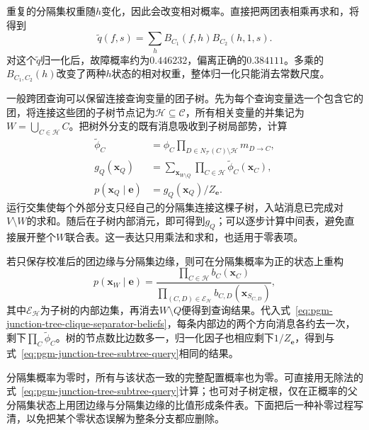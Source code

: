重复的分隔集权重随$h$变化，因此会改变相对概率。直接把两团表相乘再求和，将得到
\[
  \widetilde{q}(f,s)=\sum_h B_{C_1}(f,h)B_{C_2}(h,1,s).
\]
对这个$\widetilde q$归一化后，故障概率约为$0.446232$，偏离正确的$0.384111$。多乘的$B_{C_1,C_2}(h)$改变了两种$h$状态的相对权重，整体归一化只能消去常数尺度。

一般跨团查询可以保留连接查询变量的团子树。先为每个查询变量选一个包含它的团，将连接这些团的子树节点记为$\mathcal H\subseteq\mathcal C$，所有相关变量的并集记为$W=\bigcup_{C\in\mathcal H}C$。把树外分支的既有消息吸收到子树局部势，计算
\begin{equation}
  \begin{aligned}
    \widetilde{\phi}_C
      &=\phi_C
        \prod_{D\in N_{\mathcal{T}}(C)\setminus\mathcal{H}}m_{D\to C},\\
    g_Q(\bm{x}_Q)
      &=\sum_{\bm{x}_{W\setminus Q}}
         \prod_{C\in\mathcal{H}}\widetilde{\phi}_C(\bm{x}_C),\\
    p(\bm{x}_Q\mid\bm{e})&=g_Q(\bm{x}_Q)/Z_{\bm{e}}.
  \end{aligned}
  \label{eq:pgm-junction-tree-subtree-query}
\end{equation}
运行交集使每个外部分支只经自己的分隔集连接这棵子树，入站消息已完成对$V\setminus W$的求和。随后在子树内部消元，即可得到$g_Q$；可以逐步计算中间表，避免直接展开整个$W$联合表。这一表达只用乘法和求和，也适用于零表项。

若只保存校准后的团边缘与分隔集边缘，则可在分隔集概率为正的状态上重构
\begin{equation}
  p(\bm{x}_W\mid\bm{e})
    =\frac{\prod_{C\in\mathcal{H}}b_C(\bm{x}_C)}
           {\prod_{(C,D)\in\mathcal{E}_{\mathcal{H}}}
                b_{C,D}(\bm{x}_{S_{C,D}})},
  \label{eq:pgm-junction-tree-calibrated-factorization}
\end{equation}
其中$\mathcal E_{\mathcal H}$为子树的内部边集，再消去$W\setminus Q$便得到查询结果。代入式~\eqref{eq:pgm-junction-tree-clique-separator-beliefs}，每条内部边的两个方向消息各约去一次，剩下$\prod_C\widetilde\phi_C$。树的节点数比边数多一，归一化因子也相应剩下$1/Z_{\bm e}$，得到与式~\eqref{eq:pgm-junction-tree-subtree-query}相同的结果。

分隔集概率为零时，所有与该状态一致的完整配置概率也为零。可直接用无除法的式~\eqref{eq:pgm-junction-tree-subtree-query}计算；也可对子树定根，仅在正概率的父分隔集状态上用团边缘与分隔集边缘的比值形成条件表。下面把后一种补零过程写清，以免把某个零状态误解为整条分支都应删除。

